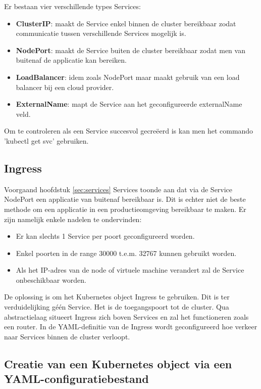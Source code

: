 Er bestaan vier verschillende types Services: 
\begin{itemize}
    \item {\bf ClusterIP}: maakt de Service enkel binnen de cluster bereikbaar zodat communicatie tussen verschillende Services mogelijk is.  
    \item {\bf NodePort}: maakt de Service buiten de cluster bereikbaar zodat men van buitenaf de applicatie kan bereiken.
    \item {\bf LoadBalancer}: idem zoals NodePort maar maakt gebruik van een load balancer bij een cloud provider.
    \item {\bf ExternalName}: mapt de Service aan het geconfigureerde externalName veld.     
\end{itemize}

Om te controleren als een Service succesvol gecreëerd is kan men het commando 'kubectl get svc' gebruiken.

\subsection{Ingress}

Voorgaand hoofdstuk \ref{sec:services} Services toonde aan dat via de Service NodePort een applicatie van buitenaf bereikbaar is. Dit is echter niet de beste methode om een applicatie in een productieomgeving bereikbaar te maken. \autocite{Dinesh2018} Er zijn namelijk enkele nadelen te ondervinden: 
\begin{itemize}
    \item Er kan slechts 1 Service per poort geconfigureerd worden.
    \item Enkel poorten in de range 30000 t.e.m. 32767 kunnen gebruikt worden.
    \item Als het IP-adres van de node of virtuele machine verandert zal de Service onbeschikbaar worden.
\end{itemize} 

De oplossing is om het Kubernetes object Ingress te gebruiken. Dit is ter verduidelijking géén Service. Het is de toegangspoort tot de cluster. Qua abstractielaag situeert Ingress zich boven Services en zal het functioneren zoals een router. 
In de YAML-definitie van de Ingress wordt geconfigureerd hoe verkeer naar Services binnen de cluster verloopt. 

\subsection{Creatie van een Kubernetes object via een YAML-configuratiebestand}

